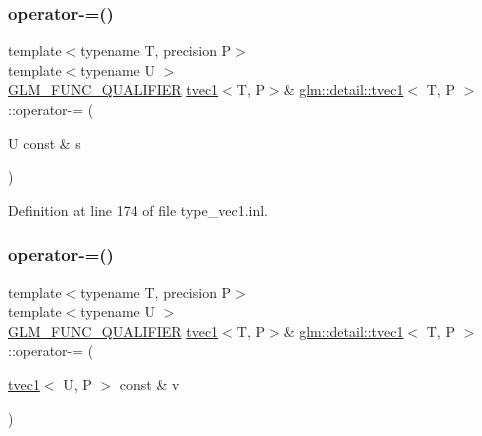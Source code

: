 \mbox{\label{structglm_1_1detail_1_1tvec1_a67d5463cd82056cfaaedab976195e362}} 
\subsubsection{\texorpdfstring{operator-\/=()}{operator-=()}\hspace{0.1cm}{\footnotesize\ttfamily [3/4]}}
{\footnotesize\ttfamily template$<$typename T, precision P$>$ \\
template$<$typename U $>$ \\
\hyperlink{setup_8hpp_a33fdea6f91c5f834105f7415e2a64407}{G\+L\+M\+\_\+\+F\+U\+N\+C\+\_\+\+Q\+U\+A\+L\+I\+F\+I\+ER} \hyperlink{structglm_1_1detail_1_1tvec1}{tvec1}$<$T, P$>$\& \hyperlink{structglm_1_1detail_1_1tvec1}{glm\+::detail\+::tvec1}$<$ T, P $>$\+::operator-\/= (\begin{DoxyParamCaption}\item[{U const \&}]{s }\end{DoxyParamCaption})}



Definition at line 174 of file type\+\_\+vec1.\+inl.

\mbox{\label{structglm_1_1detail_1_1tvec1_af596a5a7f5b2ea079cd85d576b62e326}} 
\subsubsection{\texorpdfstring{operator-\/=()}{operator-=()}\hspace{0.1cm}{\footnotesize\ttfamily [4/4]}}
{\footnotesize\ttfamily template$<$typename T, precision P$>$ \\
template$<$typename U $>$ \\
\hyperlink{setup_8hpp_a33fdea6f91c5f834105f7415e2a64407}{G\+L\+M\+\_\+\+F\+U\+N\+C\+\_\+\+Q\+U\+A\+L\+I\+F\+I\+ER} \hyperlink{structglm_1_1detail_1_1tvec1}{tvec1}$<$T, P$>$\& \hyperlink{structglm_1_1detail_1_1tvec1}{glm\+::detail\+::tvec1}$<$ T, P $>$\+::operator-\/= (\begin{DoxyParamCaption}\item[{\hyperlink{structglm_1_1detail_1_1tvec1}{tvec1}$<$ U, P $>$ const \&}]{v }\end{DoxyParamCaption})}



